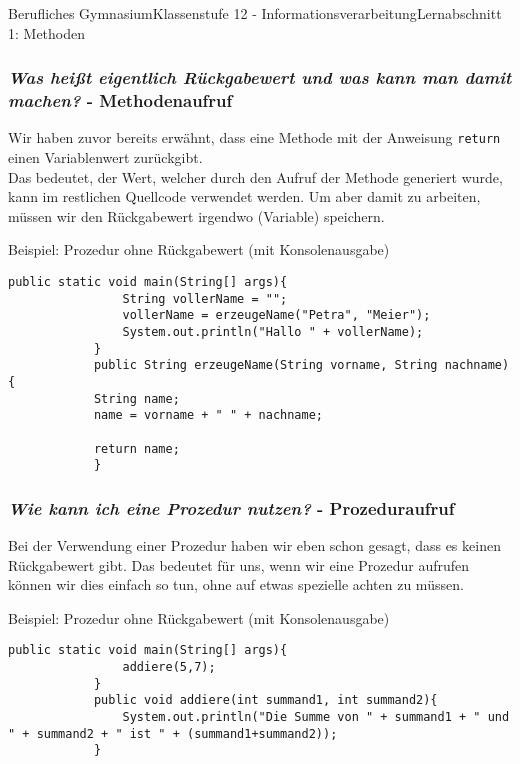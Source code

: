 \documentclass[11pt,oneside,openany,headings=optiontotoc,11pt,numbers=noenddot]{article}
\begin{document}
\begin{worksheet}{Berufliches Gymnasium}{Klassenstufe 12 - Informationsverarbeitung}{Lernabschnitt 1: Methoden}
		\subsubsection{\textit{Was heißt eigentlich Rückgabewert und was kann man damit machen?} - Methodenaufruf}
		Wir haben zuvor bereits erwähnt, dass eine Methode mit der Anweisung \lstinline[style=JavaInputStyle]|return| einen Variablenwert zurückgibt.\\
		Das bedeutet, der Wert, welcher durch den Aufruf der Methode generiert wurde, kann im restlichen Quellcode verwendet werden. Um aber damit zu arbeiten, müssen wir den Rückgabewert irgendwo (Variable) speichern.\\
		\begin{minipage}[t]{\textwidth}
			\vspace*{0pt}
			Beispiel: Prozedur ohne Rückgabewert (mit Konsolenausgabe)
			\begin{lstlisting}[style=JavaInputStyle,frame=single]
			public static void main(String[] args){
				String vollerName = "";
				vollerName = erzeugeName("Petra", "Meier");
				System.out.println("Hallo " + vollerName);
			}
			public String erzeugeName(String vorname, String nachname){
			String name;
			name = vorname + " " + nachname;
			
			return name;
			}
			\end{lstlisting}
		\end{minipage}
		\subsubsection{\textit{Wie kann ich eine Prozedur nutzen?} - Prozeduraufruf}
		Bei der Verwendung einer Prozedur haben wir eben schon gesagt, dass es keinen Rückgabewert gibt. Das bedeutet für uns, wenn wir eine Prozedur aufrufen können wir dies einfach so tun, ohne auf etwas spezielle achten zu müssen.\\
		\begin{minipage}[t]{\textwidth}
			\vspace*{0pt}
			Beispiel: Prozedur ohne Rückgabewert (mit Konsolenausgabe)
			\begin{lstlisting}[style=JavaInputStyle,frame=single]
			public static void main(String[] args){
				addiere(5,7);
			}
			public void addiere(int summand1, int summand2){
				System.out.println("Die Summe von " + summand1 + " und " + summand2 + " ist " + (summand1+summand2));
			}
			\end{lstlisting}
		\end{minipage}
	\end{worksheet}
\end{document}
